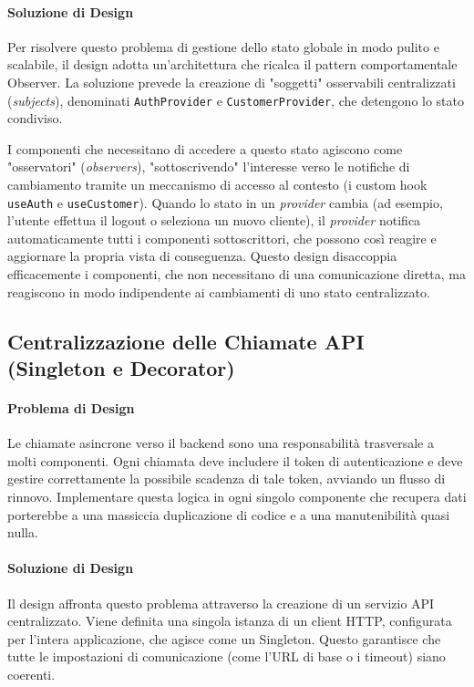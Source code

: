 \documentclass[12pt,a4paper,openright,twoside]{book}
\begin{document}
\paragraph{Soluzione di Design}
Per risolvere questo problema di gestione dello stato globale in modo pulito e scalabile, il design adotta un'architettura che ricalca il pattern comportamentale Observer. La soluzione prevede la creazione di "soggetti" osservabili centralizzati (\textit{subjects}), denominati \texttt{AuthProvider} e \texttt{CustomerProvider}, che detengono lo stato condiviso.

I componenti che necessitano di accedere a questo stato agiscono come "osservatori" (\textit{observers}), "sottoscrivendo" l'interesse verso le notifiche di cambiamento tramite un meccanismo di accesso al contesto (i custom hook \texttt{useAuth} e \texttt{useCustomer}). Quando lo stato in un \textit{provider} cambia (ad esempio, l'utente effettua il logout o seleziona un nuovo cliente), il \textit{provider} notifica automaticamente tutti i componenti sottoscrittori, che possono così reagire e aggiornare la propria vista di conseguenza. Questo design disaccoppia efficacemente i componenti, che non necessitano di una comunicazione diretta, ma reagiscono in modo indipendente ai cambiamenti di uno stato centralizzato.

\subsection{Centralizzazione delle Chiamate API (Singleton e Decorator)}
\label{subsec:design_api_singleton_decorator}

\paragraph{Problema di Design}
Le chiamate asincrone verso il backend sono una responsabilità trasversale a molti componenti. Ogni chiamata deve includere il token di autenticazione e deve gestire correttamente la possibile scadenza di tale token, avviando un flusso di rinnovo. Implementare questa logica in ogni singolo componente che recupera dati porterebbe a una massiccia duplicazione di codice e a una manutenibilità quasi nulla.

\paragraph{Soluzione di Design}
Il design affronta questo problema attraverso la creazione di un servizio API centralizzato. Viene definita una singola istanza di un client HTTP, configurata per l'intera applicazione, che agisce come un Singleton. Questo garantisce che tutte le impostazioni di comunicazione (come l'URL di base o i timeout) siano coerenti.
\end{document}
